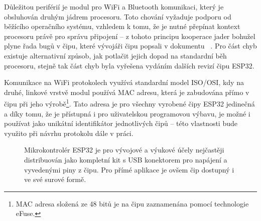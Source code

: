 Důležitou periférií je modul pro WiFi a Bluetooth komunikaci, který je obsluhován druhým jádrem procesoru.
Toto chování vyžaduje podporu od běžícího operačního systému, vzhledem k tomu, že je nutné přepínat kontext procesoru
právě pro správu připojení -- z tohoto principu kooperace jader bohužel plyne řada bugů v čipu, které vývojáři čipu
popsali v dokumentu ~\cite{ESP32KnownBugs}.
Pro část chyb existuje alternativní způsob, jak potlačit jejich dopad na standardní běh procesoru, stejně tak část
chyb byla vyřešena vydáním dalších revizí čipu ESP32.

Komunikace na WiFi protokolech využívá standardní model ISO/OSI, kdy na druhé, linkové vrstvě modul používá MAC
adresu, která je zabudována přímo v čipu při jeho výrobě\footnote{MAC adresa složená ze 48 bitů je na čipu
zaznamenána pomocí technologie eFuse.}.
Tato adresa je pro všechny vyrobené čipy ESP32 jedinečná a díky tomu, že je přístupná i pro uživatelskou programovou
výbavu, je možné i používat jako unikátní identifikátor jednotlivých čipů -- této vlastnosti bude využito při návrhu
protokolu dále v práci.

\begin{figure}
    \centering

    \quad%

    \caption{Mikrokontrolér ESP32 je pro vývojové a výukové účely nejčastěji distribuován jako kompletní kit s USB
    konektorem pro napájení a vyvedenými piny z čipu. %
    Pro přímé aplikace je ovšem čip dostupný i ve své surové formě.}

\end{figure}

